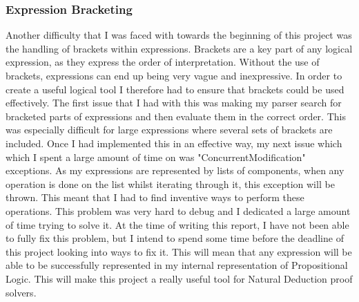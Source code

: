 \subsubsection{Expression Bracketing}
Another difficulty that I was faced with towards the beginning of this project was the handling of brackets within expressions. Brackets are a key part of any logical expression, as they express the order of interpretation. Without the use of brackets, expressions can end up being very vague and inexpressive. In order to create a useful logical tool I therefore had to ensure that brackets could be used effectively. The first issue that I had with this was making my parser search for bracketed parts of expressions and then evaluate them in the correct order. This was especially difficult for large expressions where several sets of brackets are included. Once I had implemented this in an effective way, my next issue which which I spent a large amount of time on was "ConcurrentModification" exceptions. As my expressions are represented by lists of components, when any operation is done on the list whilst iterating through it, this exception will be thrown. This meant that I had to find inventive ways to perform these operations. This problem was very hard to debug and I dedicated a large amount of time trying to solve it. At the time of writing this report, I have not been able to fully fix this problem, but I intend to spend some time before the deadline of this project looking into ways to fix it. This will mean that any expression will be able to be successfully represented in my internal representation of Propositional Logic. This will make this project a really useful tool for Natural Deduction proof solvers.

